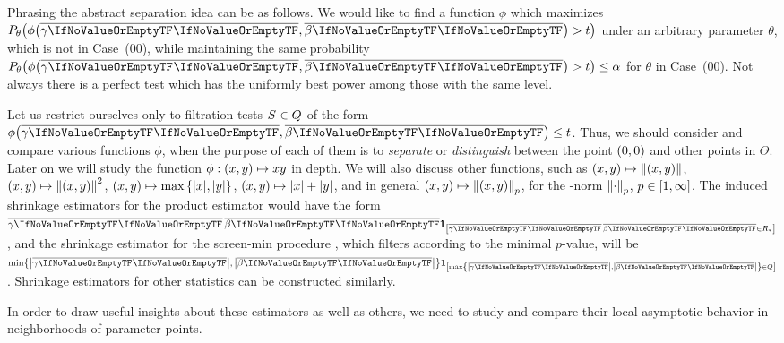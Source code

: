 \documentclass[ejs, twoside]{imsart}
\theoremstyle{plain}
\theoremstyle{remark}
\newcommand{\pvalue}{\(p\)-value}
\newcommand{\estim}[1]{\avg{\regcoef{#1}}}
\newcommand{\nullcase}[1]{(#1)}
\newcommand{\filter}{*}
\numberwithin{equation}{section}
\numberwithin{table}{section}
\numberwithin{figure}{section}
\let\originalleft\left
\let\originalright\right
\renewcommand{\left}{\mathopen{}\mathclose\bgroup\originalleft}
\renewcommand{\right}{\aftergroup\egroup\originalright}
\begin{document}
Phrasing the abstract separation idea can be as follows. We would like to find a function \(\phi\) which maximizes \(P_{\theta }\left( \phi\left( \estim{1}, \estim{2} \right) > t \right)\) under an arbitrary parameter \(\theta \), which is not in Case~\nullcase{00}, while maintaining the same probability \(P_{\theta }\left( \phi\left( \estim{1}, \estim{2} \right) > t \right) \leq \alpha\) for \(\theta \) in Case~\nullcase{00}. Not always there is a perfect test which has the uniformly best power among those with the same level. 

Let us restrict ourselves only to filtration tests \(\nfilevent\) of the form \(\phi\left(\estim{1},\estim{2} \right) \leq t \). Thus, we should consider and compare various functions \(\phi\), when the purpose of each of them is to \emph{separate} or \emph{distinguish} between the point \(\left(0,0 \right) \) and other points in \(\Theta\).
Later on we will study the function \(\phi:\left(x, y \right) \mapsto xy\) in depth. We will also discuss other functions, such as \(\left(x,y\right) \mapsto \left\|\left(x,y\right)\right\|\), \(\left(x,y\right) \mapsto \left\|\left(x,y\right)\right\|^2\), \(\left(x,y\right) \mapsto  \max{\left\lbrace \left| x\right| ,\left| y\right| \right\rbrace }\), \(\left(x,y\right) \mapsto \left|x\right|  + \left|y\right|\), and in general \(\left(x, y \right) \mapsto \left\|\left(x,y \right)  \right\|_p  \), for the \lpspace-norm \(\left\|\cdot \right\|_p \), \(p \in \left[1,\infty\right] \). %
The induced shrinkage estimators for the product estimator would have the form \(\product \indc{\product \in R_\filter}\), and the shrinkage estimator for the screen-min procedure \citep{djordjilovic_optimal_2020}, which filters according to the minimal \pvalue{}, will be \(\minestim \indc {\maxestim \in \filtrr}\). Shrinkage estimators for other statistics can be constructed similarly.

In order to draw useful insights about these estimators as well as others, we need to study and compare their local asymptotic behavior in neighborhoods of parameter points.

\end{document}
